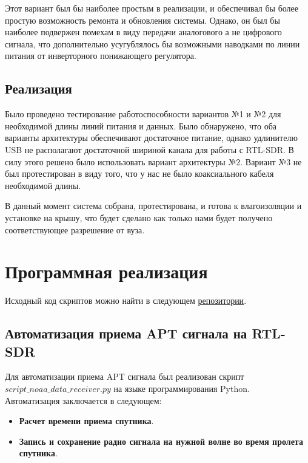 \documentclass[a4paper, 14pt, titlepage, fleqn]{extarticle}
\begin{document}
	Этот вариант был бы наиболее простым в реализации, и обеспечивал бы более простую возможность ремонта и обновления системы. Однако, он был бы наиболее подвержен помехам в виду передачи аналогового а не цифрового сигнала, что дополнительно усугублялось бы возможными наводками по линии питания от инверторного понижающего регулятора.
	
	\pagebreak
	\subsection*{Реализация}
	
	Было проведено тестирование работоспособности вариантов №1 и №2 для необходимой длины линий питания и данных. Было обнаружено, что оба варианты архитектуры обеспечивают достаточное питание, однако удлинителю USB не располагают достаточной шириной канала для работы с RTL-SDR. В силу этого решено было использовать вариант архитектуры №2. Вариант №3 не был протестирован в виду того, что у нас не было коаксиального кабеля необходимой длины.
	
	В данный момент система собрана, протестирована, и готова к влагоизоляции и установке на крышу, что будет сделано как только нами будет получено соответствующее разрешение от вуза.
	
	\pagebreak
	\section*{Программная реализация}
	
	Исходный код скриптов можно найти в следующем \href{https://github.com/kitfloppa/sdr-sat-receiving/tree/main}{репозитории}.
	
	\subsection*{Автоматизация приема APT сигнала на RTL-SDR}
	
	Для автоматизации приема APT сигнала был реализован скрипт \\
	$script\_noaa\_data\_receiver.py$ на языке программирования Python. \\
	
	\noindent Автоматизация заключается в следующем:
	
	\begin{itemize}
		\item \textbf{Расчет времени приема спутника}.
		\item \textbf{Запись и сохранение радио сигнала на нужной волне во время пролета спутника}.
	\end{itemize}
	
\end{document}
